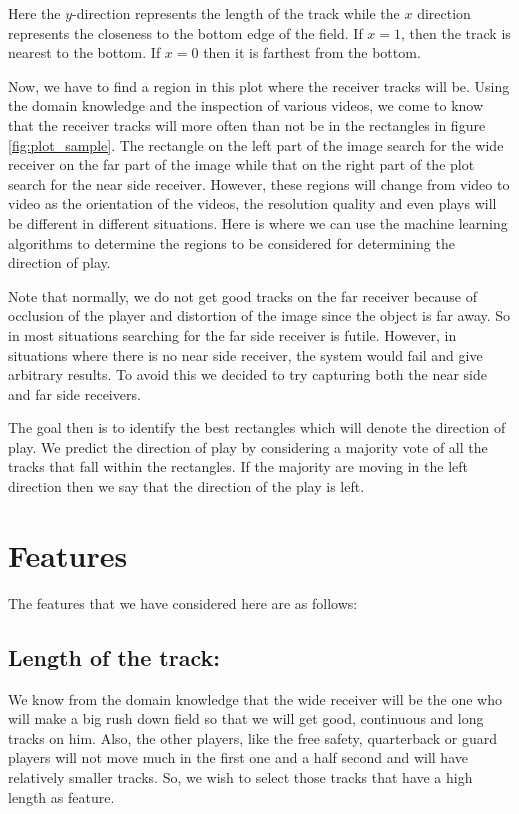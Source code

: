 \documentclass{article} %
\begin{document}
Here the $y$-direction represents the length of the track while the $x$ direction represents the closeness to the bottom edge of the field. If $x = 1$, then the track is nearest to the bottom. If $x = 0$ then it is farthest from the bottom.

Now, we have to find a region in this plot where the receiver tracks will be. Using the domain knowledge and the inspection of various videos, we come to know that the receiver tracks will more often than not be in the rectangles in figure \ref{fig:plot_sample}. The rectangle on the left part of the image search for the wide receiver on the far part of the image while that on the right part of the plot search for the near side receiver. However, these regions will change from video to video as the orientation of the videos, the resolution quality and even plays will be different in different situations. Here is where we can use the machine learning algorithms to determine the regions to be considered for determining the direction of play.

Note that normally, we do not get good tracks on the far receiver because of occlusion of the player and distortion of the image since the object is far away. So in most situations searching for the far side receiver is futile. However, in situations where there is no near side receiver, the system would fail and give arbitrary results. To avoid this we decided to try capturing both the near side and far side receivers.

The goal then is to identify the best rectangles which will denote the direction of play. We predict the direction of play by considering a majority vote of all the tracks that fall within the rectangles. If the majority are moving in the left direction then we say that the direction of the play is left.

\section{Features}

The features that we have considered here are as follows:

\subsection*{Length of the track:}

We know from the domain knowledge that the wide receiver will be the one who will make a big rush down field so that we will get good, continuous and long tracks on him. Also, the other players, like the free safety, quarterback or guard players will not move much in the first one and a half second and will have relatively smaller tracks. So, we wish to select those tracks that have a high length as feature.
	
\end{document}
